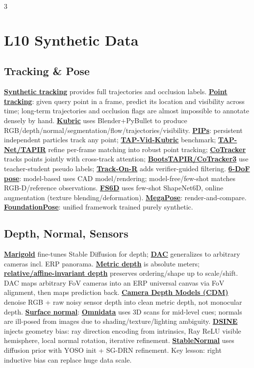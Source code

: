 \documentclass{article}
\numberwithin{equation}{subsection}
\newcommand{\lowterm}[1]{\textbf{\underline{#1}}}
\begin{document}
\begin{multicols*}{3}
\section{L10 Synthetic Data}
\subsection{Tracking \& Pose}
\lowterm{Synthetic tracking} provides full trajectories and occlusion labels. \lowterm{Point tracking}: given query point in a frame, predict its location and visibility across time; long-term trajectories and occlusion flags are almost impossible to annotate densely by hand. \lowterm{Kubric} uses Blender+PyBullet to produce RGB/depth/normal/segmentation/flow/trajectories/visibility. \lowterm{PIPs}: persistent independent particles track any point; \lowterm{TAP-Vid-Kubric} benchmark; \lowterm{TAP-Net/TAPIR} refine per-frame matching into robust point tracking; \lowterm{CoTracker} tracks points jointly with cross-track attention; \lowterm{BootsTAPIR/CoTracker3} use teacher-student pseudo labels; \lowterm{Track-On-R} adds verifier-guided filtering.
\lowterm{6-DoF pose}: model-based uses CAD model/rendering; model-free/few-shot matches RGB-D/reference observations. \lowterm{FS6D} uses few-shot ShapeNet6D, online augmentation (texture blending/deformation). \lowterm{MegaPose}: render-and-compare. \lowterm{FoundationPose}: unified framework trained purely synthetic. 

\subsection{Depth, Normal, Sensors}
\lowterm{Marigold} fine-tunes Stable Diffusion for depth; \lowterm{DAC} generalizes to arbitrary cameras incl. ERP panorama. \lowterm{Metric depth} is absolute meters; \lowterm{relative/affine-invariant depth} preserves ordering/shape up to scale/shift. DAC maps arbitrary FoV cameras into an ERP universal canvas via FoV alignment, then maps prediction back. \lowterm{Camera Depth Models (CDM)} denoise RGB + raw noisy sensor depth into clean metric depth, not monocular depth. \lowterm{Surface normal}: \lowterm{Omnidata} uses 3D scans for mid-level cues; normals are ill-posed from images due to shading/texture/lighting ambiguity. \lowterm{DSINE} injects geometry bias: ray direction encoding from intrinsics, Ray ReLU visible hemisphere, local normal rotation, iterative refinement. \lowterm{StableNormal} uses diffusion prior with YOSO init + SG-DRN refinement. Key lesson: right inductive bias can replace huge data scale.


\end{multicols*}
\end{document}
